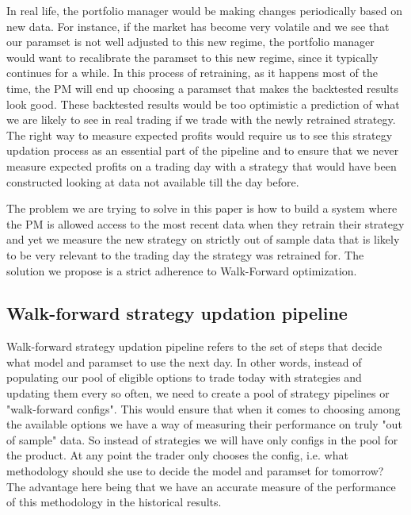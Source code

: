 \documentclass[a4paper]{article}
\begin{document}

In real life, the portfolio manager would be making changes periodically based on new data. For instance, if the market has become very volatile and we see that our paramset is not well adjusted to this new regime, the portfolio manager would want to recalibrate the paramset to this new regime, since it typically continues for a while. In this process of retraining, as it happens most of the time, the PM will end up choosing a paramset that makes the backtested results look good. These backtested results would be too optimistic a prediction of what we are likely to see in real trading if we trade with the newly retrained strategy.\\
The right way to measure expected profits would require us to see this strategy updation process as an essential part of the pipeline and to ensure that we never measure expected profits on a trading day with a strategy that would have been constructed looking at data not available till the day before.

The problem we are trying to solve in this paper is how to build a system where the PM is allowed access to the most recent data when they retrain their strategy and yet we measure the new strategy on strictly out of sample data that is likely to be very relevant to the trading day the strategy was retrained for. The solution we propose is a strict adherence to Walk-Forward optimization.

\subsection{Walk-forward strategy updation pipeline}
Walk-forward strategy updation pipeline refers to the set of steps that decide what model and paramset to use the next day. In other words, instead of populating our pool of eligible options to trade today with strategies and updating them every so often, we need to create a pool of strategy pipelines or "walk-forward configs". This would ensure that when it comes to choosing among the available options we have a way of measuring their performance on truly "out of sample" data. So instead of strategies we will have only configs in the pool for the product. At any point the trader only chooses the config, i.e. what methodology should she use to decide the model and paramset for tomorrow? The advantage here being that we have an accurate measure of the performance of this methodology in the historical results.
\end{document}
